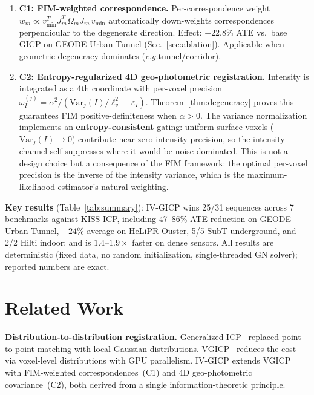 \documentclass[journal,letterpaper,10pt]{IEEEtran}
\newcommand{\vmin}{v_{\min}}
\newcommand{\eg}{\textit{e.g.}}
\begin{document}
\begin{enumerate}
\item \textbf{C1: FIM-weighted correspondence.}
  Per-correspondence weight $w_m \propto \vmin^T J_m^T\Omega_m J_m\,\vmin$
  automatically down-weights correspondences perpendicular to the
  degenerate direction.
  Effect: $-22.8\%$ ATE vs.\ base GICP on GEODE Urban Tunnel
  (Sec.~\ref{sec:ablation}).
  Applicable when geometric degeneracy dominates (\eg tunnel/corridor).

\item \textbf{C2: Entropy-regularized 4D geo-photometric registration.}
  Intensity is integrated as a 4th coordinate with per-voxel precision
  $\omega_I^{(j)} = \alpha^2/(\mathrm{Var}_j(I)/\ell_v^2+\varepsilon_I)$.
  Theorem~\ref{thm:degeneracy} proves this guarantees FIM
  positive-definiteness when $\alpha > 0$.
  The variance normalization implements an \textbf{entropy-consistent}
  gating: uniform-surface voxels ($\mathrm{Var}_j(I) \to 0$) contribute
  near-zero intensity precision, so the intensity channel self-suppresses
  where it would be noise-dominated.
  This is not a design choice but a consequence of the FIM framework:
  the optimal per-voxel precision is the inverse of the intensity
  variance, which is the maximum-likelihood estimator's natural
  weighting.
\end{enumerate}

\noindent\textbf{Key results} (Table~\ref{tab:summary}): IV-GICP wins
25/31 sequences across 7 benchmarks against KISS-ICP, including
47--86\% ATE reduction on GEODE Urban Tunnel, $-24\%$ average on
HeLiPR Ouster, 5/5 SubT underground, and 2/2 Hilti indoor;
and is $1.4$--$1.9\times$ faster on dense sensors.
All results are deterministic (fixed data, no random initialization,
single-threaded GN solver); reported numbers are exact.

\section{Related Work}\label{sec:related}

\textbf{Distribution-to-distribution registration.}
Generalized-ICP~\cite{segal2009generalized} replaced point-to-point
matching with local Gaussian distributions.
VGICP~\cite{koide2021voxel} reduces the cost via voxel-level
distributions with GPU parallelism.
IV-GICP extends VGICP with FIM-weighted correspondences~(C1) and
4D geo-photometric covariance~(C2), both derived from a single
information-theoretic principle.
\end{document}

